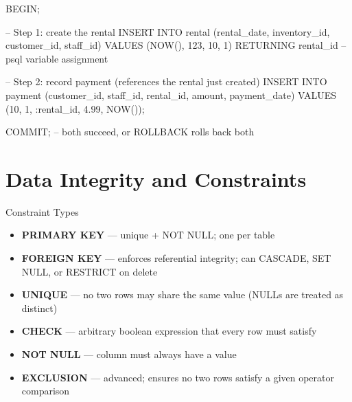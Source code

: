 \documentclass[11pt,a4paper]{article}
\begin{document}
\begin{sqlcode}[title={\texttt{</>}\quad Example --- Atomic Rental + Payment}]
BEGIN;

-- Step 1: create the rental
INSERT INTO rental (rental_date, inventory_id, customer_id, staff_id)
VALUES (NOW(), 123, 10, 1)
RETURNING rental_id \gset   -- psql variable assignment

-- Step 2: record payment (references the rental just created)
INSERT INTO payment (customer_id, staff_id, rental_id, amount, payment_date)
VALUES (10, 1, :rental_id, 4.99, NOW());

COMMIT;  -- both succeed, or ROLLBACK rolls back both
\end{sqlcode}

\section{Data Integrity and Constraints}

\begin{conceptbox}{Constraint Types}
\begin{itemize}[noitemsep]
  \item \textbf{PRIMARY KEY} --- unique + NOT NULL; one per table
  \item \textbf{FOREIGN KEY} --- enforces referential integrity; can CASCADE, SET NULL, or RESTRICT on delete
  \item \textbf{UNIQUE} --- no two rows may share the same value (NULLs are treated as distinct)
  \item \textbf{CHECK} --- arbitrary boolean expression that every row must satisfy
  \item \textbf{NOT NULL} --- column must always have a value
  \item \textbf{EXCLUSION} --- advanced; ensures no two rows satisfy a given operator comparison
\end{itemize}
\end{conceptbox}
\end{document}
